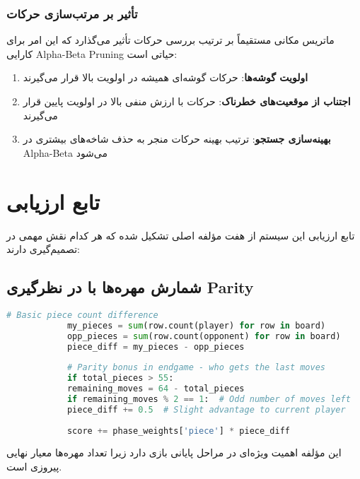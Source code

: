 \documentclass[12pt]{article}
\newenvironment{ltrcode}{\lr\bgroup}{\egroup}
\begin{document}
	\subsubsection{تأثیر بر مرتب‌سازی حرکات}
	
	ماتریس مکانی مستقیماً بر ترتیب بررسی حرکات تأثیر می‌گذارد که این امر برای کارایی Alpha-Beta Pruning حیاتی است:
	
	\begin{enumerate}
		\item \textbf{اولویت گوشه‌ها}: حرکات گوشه‌ای همیشه در اولویت بالا قرار می‌گیرند
		\item \textbf{اجتناب از موقعیت‌های خطرناک}: حرکات با ارزش منفی بالا در اولویت پایین قرار می‌گیرند  
		\item \textbf{بهینه‌سازی جستجو}: ترتیب بهینه حرکات منجر به حذف شاخه‌های بیشتری در Alpha-Beta می‌شود
	\end{enumerate}
	
	\section{تابع ارزیابی}
	
	تابع ارزیابی این سیستم از هفت مؤلفه اصلی تشکیل شده که هر کدام نقش مهمی در تصمیم‌گیری دارند:
	
	\subsection{شمارش مهره‌ها با در نظرگیری Parity}
	
	\begin{ltrcode}
		\begin{lstlisting}[language=Python, caption=Piece Count with Parity Consideration]
			# Basic piece count difference
			my_pieces = sum(row.count(player) for row in board)
			opp_pieces = sum(row.count(opponent) for row in board)
			piece_diff = my_pieces - opp_pieces
			
			# Parity bonus in endgame - who gets the last moves
			if total_pieces > 55:
			remaining_moves = 64 - total_pieces
			if remaining_moves % 2 == 1:  # Odd number of moves left
			piece_diff += 0.5  # Slight advantage to current player
			
			score += phase_weights['piece'] * piece_diff
		\end{lstlisting}
	\end{ltrcode}
	
	این مؤلفه اهمیت ویژه‌ای در مراحل پایانی بازی دارد زیرا تعداد مهره‌ها معیار نهایی پیروزی است.
	
\end{document}
